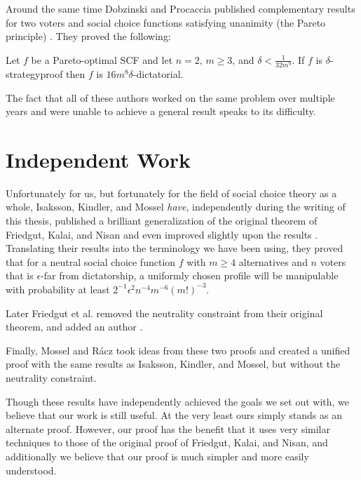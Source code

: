 	Around the same time Dobzinski and Procaccia published complementary results for two voters and social choice functions satisfying unanimity (the Pareto principle) \cite{dobzinski2008frequent}. They proved the following:

	\begin{theorem}
		Let $f$ be a Pareto-optimal SCF and let $n = 2$, $m \ge 3$, and $\delta < \frac{1}{32m^9}$. If $f$ is $\delta$-strategyproof then $f$ is $16m^8 \delta$-dictatorial.
	\end{theorem}

	The fact that all of these authors worked on the same problem over multiple years and were unable to achieve a general result speaks to its difficulty.


\section{Independent Work}

	Unfortunately for us, but fortunately for the field of social choice theory as a whole, Isaksson, Kindler, and Mossel \emph{have}, independently during the writing of this thesis, published a brilliant generalization of the original theorem of Friedgut, Kalai, and Nisan and even improved slightly upon the results \cite{isaksson2010geometry}. Translating their results into the terminology we have been using, they proved that for a neutral social choice function $f$ with $m \ge 4$ alternatives and $n$ voters that is $\epsilon$-far from dictatorship, a uniformly chosen profile will be manipulable with probability at least $2^{-1} \epsilon^2 n^{-4} m^{-6} (m!)^{-3}$.

	Later Friedgut et al. removed the neutrality constraint from their original theorem, and added an author \cite{friedgut2011quantitative}.

	Finally, Mossel and R\'{a}cz \cite{mossel2011quantitative} took ideas from these two proofs and created a unified proof with the same results as Isaksson, Kindler, and Mossel, but without the neutrality constraint.

	Though these results have independently achieved the goals we set out with, we believe that our work is still useful. At the very least ours simply stands as an alternate proof. However, our proof has the benefit that it uses very similar techniques to those of the original proof of Friedgut, Kalai, and Nisan, and additionally we believe that our proof is much simpler and more easily understood.


